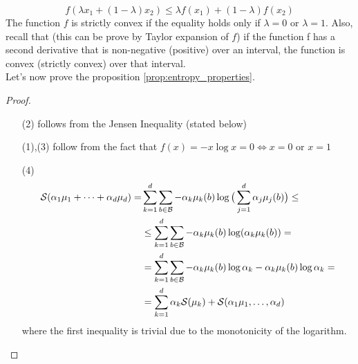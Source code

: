 \begin{equation*}
    f(\lambda x_1 + (1 - \lambda)x_2) \leq \lambda f(x_1) + (1- \lambda) f(x_2)
\end{equation*}
The function $f$ is strictly convex if the equality holds only if $\lambda=0$ or $\lambda=1$. Also, recall that (this can be prove by Taylor expansion of $f$) if the function f has a second derivative that is non-negative (positive) over
an interval, the function is convex (strictly convex) over that interval.
\\Let's now prove the proposition \ref{prop:entropy_properties}.
\begin{proof}
\hfill
    \begin{itemize}
        \item[(2)] follows from the Jensen Inequality (stated below)
        \item[(1),(3)] follow from the fact that $f(x) = -  x\log x = 0 \Leftrightarrow x=0$ or $x=1$
        \item[(4)] 
        \begin{align*}
            \mathcal{S} (\alpha_1 \mu_1 + \dots + \alpha_d \mu_d) = & \sum_{k=1}^d \sum_{b \in \mathcal{B}} - \alpha_k \mu_k(b) \log \big( \sum_{j=1}^d \alpha_j \mu_j (b)  \big) \leq  \\ & \leq \sum_{k=1}^d \sum_{b \in \mathcal{B}} - \alpha_k \mu_k(b) \log (\alpha_k \mu_k (b)) = \\ & = \sum_{k=1}^d \sum_{b \in \mathcal{B}} - \alpha_k \mu_k(b) \log \alpha_k - \alpha_k \mu_k(b) \log \alpha_k = \\ & = \sum_{k=1}^d \alpha_k \mathcal{S} (\mu_k) + \mathcal{S}(\alpha_1 \mu_1, \dots, \alpha_d)
        \end{align*}
        where the first inequality is trivial due to the monotonicity of the logarithm.
    \end{itemize}
\end{proof}

